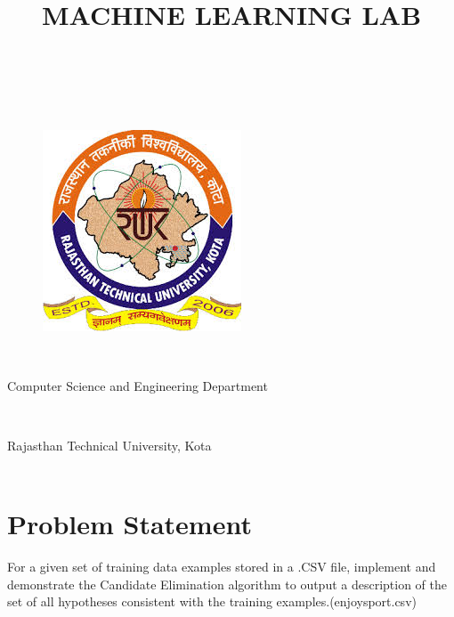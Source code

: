 \documentclass[a4paper]{article}
\begin{document}
	\title{\textbf{MACHINE LEARNING LAB}}
	\maketitle
	\\
	\\
	\begin{figure}[h]
		\centering
		\includegraphics{rtu.jpeg}
	\end{figure}\\

	\begin{large}
		Computer Science and Engineering Department
	\end{large}\\
\newline
	\begin{Large}
			Rajasthan Technical University, Kota\\[2.5]\\
	\end{Large}
	\newpage
	\flushleft
	\tableofcontents
	\newpage
	\section{Problem Statement}
		For a given set of training data examples stored in a .CSV file, implement and demonstrate the Candidate Elimination algorithm to output a description of the set of all hypotheses consistent with the training examples.(enjoysport.csv)\\
\end{document}
